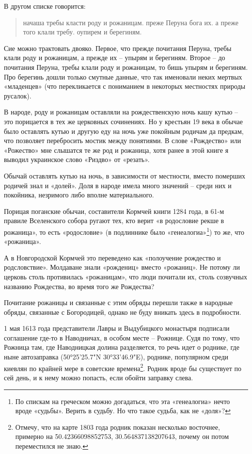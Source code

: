 В другом списке говорится: 

\begin{quotation}
начаша требы класти роду и рожаницам. преже Перуна бога их. а преже того клали требу. оупирем и берегиням.
\end{quotation}

Сие можно трактовать двояко. Первое, что прежде почитания Перуна, требы клали роду и рожаницам, а прежде их – упырям и берегиням. Второе – до почитания Перуна, требы клали роду и рожаницам, то бишь упырям и берегиням. Про берегинь дошли только смутные данные, что так именовали неких мертвых «младенцев» (что перекликается с пониманием в некоторых местностях природы русалок).

В народе, роду и рожаницам оставляли на рождественскую ночь кашу кутью – это порицается в тех же церковных сочинениях. Но у крестьян 19 века в обычае было оставлять кутью и другую еду на ночь уже покойным родичам да предкам, что позволяет перебросить мостик между понятиями. В слове «Рождество» или «Рожество» мне слышатся те же род и рожаница, хотя ранее в этой книге я выводил украинское слово «Риздво» от «резать».%

Обычай оставлять кутью на ночь, в зависимости от местности, вместо померших родичей знал и «долей». Доля в народе имела много значений – среди них и покойника, незримого либо вполне материального.

Порицая поганские обычаи, составители Кормчей книги 1284 года, в 61-м правиле Вселенского собора ругают тех, кто верит «в родословие рекше в рожаница», то есть «родословие» (в подлиннике было «генеалогиа»\footnote{По спискам на греческом можно догадаться, что эта «генеалогиа» нечто вроде «судьбы». Верить в судьбу. Но что такое судьба, как не «доля»?}) то же, что «рожаница».

А в Новгородской Кормчей это переведено как «полоучение рождество и родсловствие». Молдаване знали «рождениц» вместо «рожаниц». Не потому ли церковь столь противилась «рожаницам», что люди почитали их, столь созвучных названию Рождества, во время того же Рождества?

Почитание рожаницы и связанные с этим обряды перешли также в народные обряды, связанные с Богородицей, однако не буду вникать здесь в подробности.

1 мая 1613 года представители Лавры и Выдубицкого монастыря подписали соглашение где-то в Наводничах, в особом месте – Рожнице. Судя по тому, что Рожница там, где Наводницкая долина разделяется, то речь идет о роднике, где ныне автозаправка (50°25'25.7"N 30°33'46.9"E), роднике, популярном среди киевлян по крайней мере в советские времена\footnote{Отмечу, что на карте 1803 года родник показан несколько восточнее, примерно на 50.42366098852753, 30.564837138207643, почему он потом переместился не знаю.}. Родник вроде бы существует по сей день, и к нему можно попасть, если обойти заправку слева.

